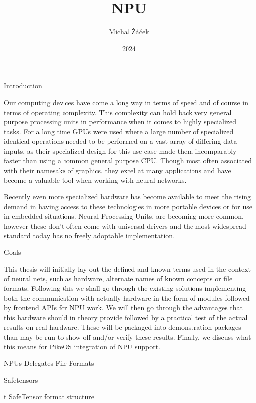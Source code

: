 \load[ctustyle3]
\worktype[B/EN]
\title{NPU}
\author{Michal Žáček}
\date{2024}
\draft

\def\OpenVX{OpenVX™}

\makefront

\chap Introduction

Our computing devices have come a long way in terms of speed
and of course in terms of operating complexity.
This complexity can hold back very general purpose processing units
in performance when it comes to highly specialized tasks.
For a long time GPUs were used where a large number
of specialized identical operations needed to be performed on
a vast array of differing data inputs,
as their specialized design for this use-case made them incomparably faster than
using a common general purpose CPU.
Though most often associated with their namesake of graphics,
they excel at many applications and have become a
valuable tool when working with neural networks.

Recently even more specialized hardware has become available
to meet the rising demand in having access to these technologies
in more portable devices or for use in embedded situations.
Neural Processing Units,
are becoming more common,
however these don't often come with universal drivers
and the most widespread standard today has no freely adoptable implementation.

\sec Goals

This thesis will initially lay out the defined and known terms used in the context of neural nets, such as hardware, alternate names of known concepts or file formats.
Following this we shall go through the existing solutions implementing both the communication with actually hardware in the form of modules followed by frontend APIs for NPU work.
We will then go through the advantages that this hardware should in theory provide followed by a practical test of the actual results on real hardware.
These will be packaged into demonstration packages than may be run to show off and/or verify these results.
Finally, we discuss what this means for PikeOS integration of NPU support.

\sec NPUs
\sec Delegates
\sec File Formats

\secc Safetensors

\midinsert {}
\caption/t SafeTensor format structure
\endinsert

